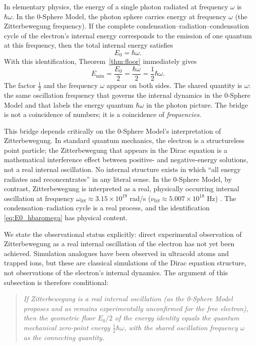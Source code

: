 \documentclass[%
 reprint, amsmath,amssymb, aps, prb, ]{revtex4-2}
\numberwithin{equation}{section}
\begin{document}
In elementary physics, the energy of a single photon radiated at frequency $\omega$ is $\hbar\omega$. In the 0-Sphere Model, the photon sphere carries energy at frequency $\omega$ (the Zitterbewegung frequency). If the complete condensation--radiation--condensation cycle of the electron's internal energy corresponds to the emission of one quantum at this frequency, then the total internal energy satisfies
\begin{equation}
E_0 = \hbar\omega.
\label{eq:E0_hbaromega}
\end{equation}
With this identification, Theorem~\ref{thm:floor} immediately gives
\begin{equation}
E_\text{min} = \frac{E_0}{2} = \frac{\hbar\omega}{2} = \frac{1}{2}\hbar\omega.
\label{eq:ZPE_bridge}
\end{equation}
The factor $\tfrac{1}{2}$ and the frequency $\omega$ appear on both sides. The shared quantity is $\omega$: the same oscillation frequency that governs the internal dynamics in the 0-Sphere Model and that labels the energy quantum $\hbar\omega$ in the photon picture. The bridge is not a coincidence of numbers; it is a coincidence of \emph{frequencies}.

This bridge depends critically on the 0-Sphere Model's interpretation of Zitterbewegung. In standard quantum mechanics, the electron is a structureless point particle; the Zitterbewegung that appears in the Dirac equation is a mathematical interference effect between positive- and negative-energy solutions, not a real internal oscillation. No internal structure exists in which ``all energy radiates and reconcentrates'' in any literal sense. In the 0-Sphere Model, by contrast, Zitterbewegung is interpreted as a real, physically occurring internal oscillation at frequency $\omega_{0S} \approx 3.15\times10^{19}$ rad/s ($\nu_{0S}\approx 5.007\times10^{18}$ Hz) \cite{hanamura_spin2024}. The condensation--radiation cycle is a real process, and the identification \eqref{eq:E0_hbaromega} has physical content.

We state the observational status explicitly: direct experimental observation of Zitterbewegung as a real internal oscillation of the electron has not yet been achieved. Simulation analogues have been observed in ultracold atoms and trapped ions, but these are classical simulations of the Dirac equation structure, not observations of the electron's internal dynamics. The argument of this subsection is therefore conditional:

\begin{quote}
\textit{If Zitterbewegung is a real internal oscillation (as the 0-Sphere Model proposes and as remains experimentally unconfirmed for the free electron), then the geometric floor $E_0/2$ of the energy identity equals the quantum mechanical zero-point energy $\tfrac{1}{2}\hbar\omega$, with the shared oscillation frequency $\omega$ as the connecting quantity.}
\end{quote}
\end{document}
